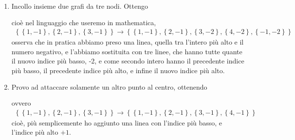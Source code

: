 \documentclass{report}
\begin{document}
\begin{enumerate}
    \item Incollo insieme due grafi da tre nodi. Ottengo 
    \begin{center}
    \end{center}
    cioè nel linguaggio che useremo in mathematica, 
    \begin{align}
        \left\{ \left\{1, -1 \right\}, \left\{2, -1 \right\}, \left\{3, -1 \right\} \right\} \rightarrow \left\{ \left\{1, -1 \right\}, \left\{2, -1 \right\}, \left\{3, -2 \right\}, \left\{4, -2 \right\}, \left\{-1, -2 \right\} \right\}
    \end{align}
    osserva che in pratica abbiamo preso una linea, quella tra l'intero più alto e il numero negativo, e l'abbiamo sostituita con tre linee, che hanno tutte quante il nuovo indice più basso, -2, e come secondo intero hanno il precedente indice più basso, il precedente indice più alto, e infine il nuovo indice più alto. 
    \item Provo ad attaccare solamente un altro punto al centro, ottenendo 
    \begin{center}
    \end{center}
    ovvero 
    \begin{align}
        \left\{ \left\{1, -1 \right\}, \left\{2, -1 \right\}, \left\{3, -1 \right\} \right\} \rightarrow \left\{ \left\{1, -1 \right\}, \left\{2, -1 \right\}, \left\{3, -1 \right\}, \left\{4, -1 \right\} \right\}
    \end{align}
    cioè, più semplicemente ho aggiunto una linea con l'indice più basso, e l'indice più alto \(+1\).
\end{enumerate}
\end{document}
